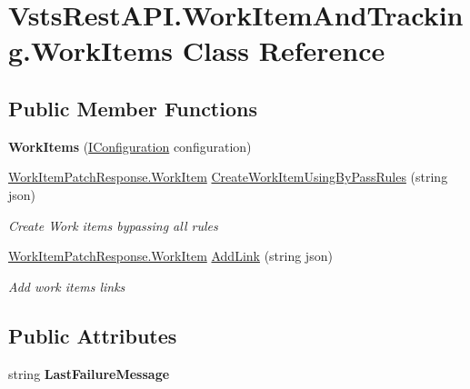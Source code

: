\hypertarget{class_vsts_rest_a_p_i_1_1_work_item_and_tracking_1_1_work_items}{}\section{Vsts\+Rest\+A\+P\+I.\+Work\+Item\+And\+Tracking.\+Work\+Items Class Reference}
\label{class_vsts_rest_a_p_i_1_1_work_item_and_tracking_1_1_work_items}
\subsection*{Public Member Functions}
\begin{DoxyCompactItemize}
\item 
\mbox{\label{class_vsts_rest_a_p_i_1_1_work_item_and_tracking_1_1_work_items_ad2e130548f5c015c9c81d3582f58ba00}} 
{\bfseries Work\+Items} (\mbox{\hyperlink{interface_vsts_rest_a_p_i_1_1_i_configuration}{I\+Configuration}} configuration)
\item 
\mbox{\hyperlink{class_vsts_rest_a_p_i_1_1_viewmodel_1_1_work_item_1_1_work_item_patch_response_1_1_work_item}{Work\+Item\+Patch\+Response.\+Work\+Item}} \mbox{\hyperlink{class_vsts_rest_a_p_i_1_1_work_item_and_tracking_1_1_work_items_a7ff12afa440b5f590d051bc0c6c74e04}{Create\+Work\+Item\+Using\+By\+Pass\+Rules}} (string json)
\begin{DoxyCompactList}\small\item\em Create Work items bypassing all rules \end{DoxyCompactList}\item 
\mbox{\hyperlink{class_vsts_rest_a_p_i_1_1_viewmodel_1_1_work_item_1_1_work_item_patch_response_1_1_work_item}{Work\+Item\+Patch\+Response.\+Work\+Item}} \mbox{\hyperlink{class_vsts_rest_a_p_i_1_1_work_item_and_tracking_1_1_work_items_ac843d9b1bc4583e7952584dd89a63279}{Add\+Link}} (string json)
\begin{DoxyCompactList}\small\item\em Add work items links \end{DoxyCompactList}\end{DoxyCompactItemize}
\subsection*{Public Attributes}
\begin{DoxyCompactItemize}
\item 
\mbox{\label{class_vsts_rest_a_p_i_1_1_work_item_and_tracking_1_1_work_items_a545dd0c1f3ecb8c72fa6e098e4f15219}} 
string {\bfseries Last\+Failure\+Message}
\end{DoxyCompactItemize}


